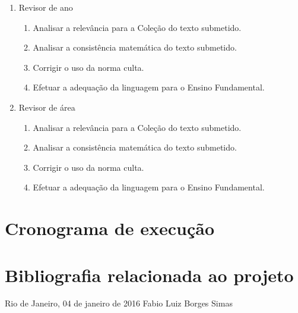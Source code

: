 \documentclass[10 pt]{article}
\begin{document}
\begin{enumerate}%
\item Revisor de ano
  \begin{enumerate}%
  \item Analisar a relevância para a Coleção do texto submetido.
  \item Analisar a consistência matemática do texto submetido.
  \item Corrigir o uso da norma culta.
  \item Efetuar a adequação da linguagem para o Ensino Fundamental.
  \end{enumerate}

\item Revisor de área
  \begin{enumerate}%
  \item Analisar a relevância para a Coleção do texto submetido.
  \item Analisar a consistência matemática do texto submetido.
  \item Corrigir o uso da norma culta.
  \item Efetuar a adequação da linguagem para o Ensino Fundamental.
  \end{enumerate}
\end{enumerate}

\section{Cronograma de execução}

\section{Bibliografia relacionada ao projeto}

\begin{center}
  Rio de Janeiro, 04 de janeiro de 2016 \hspace{2cm} Fabio Luiz Borges Simas
\end{center}


% 
\end{document}
